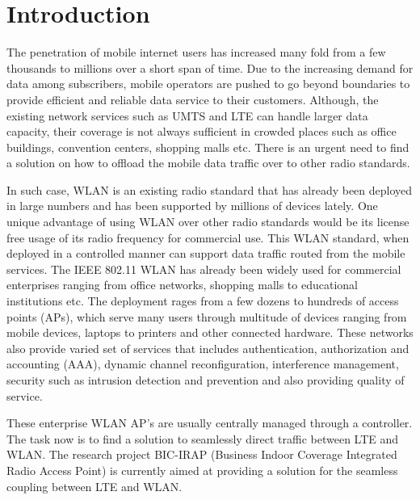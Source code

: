 
\chapter{Introduction}\label{ch:introduction}
\sffamily{}
The penetration of mobile internet users has increased many fold from a few thousands to millions over a short span of time. Due to the increasing demand for data among subscribers, mobile operators are pushed to go beyond boundaries to provide efficient and reliable data service to their customers. Although, the existing network services such as UMTS and LTE can handle larger data capacity, their coverage is not always sufficient in crowded places such as office buildings, convention centers, shopping malls etc. There is an urgent need to find a solution on how to offload the mobile data traffic over to other radio standards.

In such case, WLAN is an existing radio standard that has already been deployed in large numbers and has been supported by millions of devices lately. One unique advantage of using WLAN over other radio standards would be its license free usage of its radio frequency for commercial use. This WLAN standard, when deployed in a controlled manner can support data traffic routed from the mobile services. The IEEE 802.11 WLAN has already been widely used for commercial enterprises ranging from office networks, shopping malls to educational institutions etc. The deployment rages from a few dozens to hundreds of access points (APs), which serve many users through multitude of devices ranging from mobile devices, laptops to printers and other connected hardware. These networks also provide varied set of services that includes authentication, authorization and accounting (AAA), dynamic channel reconfiguration, interference management, security such as intrusion detection and prevention and also providing quality of service. 

These enterprise WLAN AP’s are usually centrally managed through a controller. The task now is to find a solution to seamlessly direct traffic between LTE and WLAN. The research project BIC-IRAP (Business Indoor Coverage Integrated Radio Access Point) is currently aimed at providing a solution for the seamless coupling between LTE and WLAN.


